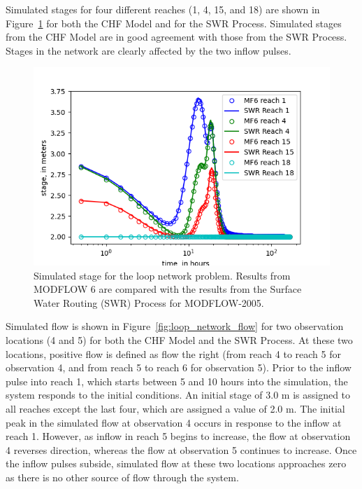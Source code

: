 \documentclass[fleqn]{article}
\begin{document}
Simulated stages for four different reaches (1, 4, 15, and 18) are shown in Figure~\ref{fig:loop_network_stage} for both the CHF Model and for the SWR Process.  Simulated stages from the CHF Model are in good agreement with those from the SWR Process.  Stages in the network are clearly affected by the two inflow pulses.

\begin{figure}
	\centering
	\includegraphics[scale=0.70]{figures/loop_network_stage.png}
	\caption[Simulated stage for the loop network problem.]{Simulated stage for the loop network problem.  Results from MODFLOW 6 are compared with the results from the Surface Water Routing (SWR) Process for MODFLOW-2005.}
	\label{fig:loop_network_stage}
\end{figure}

Simulated flow is shown in Figure~\ref{fig:loop_network_flow} for two observation locations (4 and 5) for both the CHF Model and the SWR Process.  At these two locations, positive flow is defined as flow the right (from reach 4 to reach 5 for observation 4, and from reach 5 to reach 6 for observation 5).  Prior to the inflow pulse into reach 1, which starts between 5 and 10 hours into the simulation, the system responds to the initial conditions.  An initial stage of 3.0 m is assigned to all reaches except the last four, which are assigned a value of 2.0 m.  The initial peak in the simulated flow at observation 4 occurs in response to the inflow at reach 1.  However, as inflow in reach 5 begins to increase, the flow at observation 4 reverses direction, whereas the flow at observation 5 continues to increase.  Once the inflow pulses subside, simulated flow at these two locations approaches zero as there is no other source of flow through the system.
\end{document}
